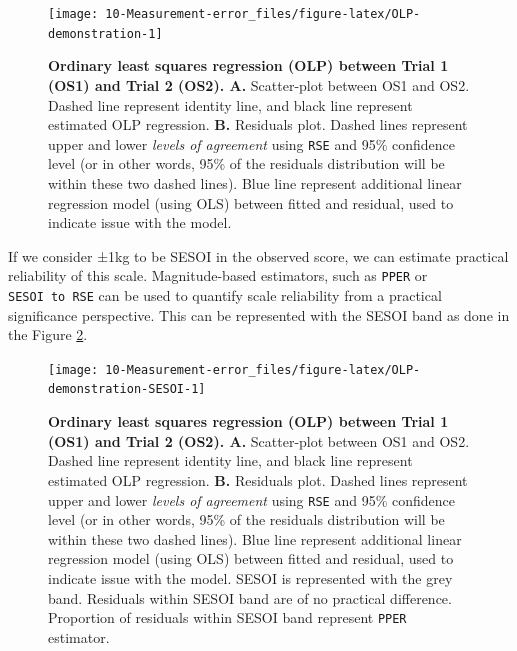\documentclass[
]{book}
\begin{document}
\begin{figure}

{\centering \texttt{[image: 10-Measurement-error\_files/figure-latex/OLP-demonstration-1]} 

}

\caption{\textbf{Ordinary least squares regression (OLP) between Trial 1 (OS1) and Trial 2 (OS2). A. } Scatter-plot between OS1 and OS2. Dashed line represent identity line, and black line represent estimated OLP regression. \textbf{B.} Residuals plot. Dashed lines represent upper and lower \emph{levels of agreement} using \texttt{RSE} and 95\% confidence level (or in other words, 95\% of the residuals distribution will be within these two dashed lines). Blue line represent additional linear regression model (using OLS) between fitted and residual, used to indicate issue with the model.}\label{fig:OLP-demonstration}
\end{figure}



If we consider ±1kg to be SESOI in the observed score, we can estimate practical reliability of this scale. Magnitude-based estimators, such as \texttt{PPER} or \texttt{SESOI\ to\ RSE} can be used to quantify scale reliability from a practical significance perspective. This can be represented with the SESOI band as done in the Figure \ref{fig:OLP-demonstration-SESOI}.

\begin{figure}

{\centering \texttt{[image: 10-Measurement-error\_files/figure-latex/OLP-demonstration-SESOI-1]} 

}

\caption{\textbf{Ordinary least squares regression (OLP) between Trial 1 (OS1) and Trial 2 (OS2). A. } Scatter-plot between OS1 and OS2. Dashed line represent identity line, and black line represent estimated OLP regression. \textbf{B.} Residuals plot. Dashed lines represent upper and lower \emph{levels of agreement} using \texttt{RSE} and 95\% confidence level (or in other words, 95\% of the residuals distribution will be within these two dashed lines). Blue line represent additional linear regression model (using OLS) between fitted and residual, used to indicate issue with the model. SESOI is represented with the grey band. Residuals within SESOI band are of no practical difference. Proportion of residuals within SESOI band represent \texttt{PPER} estimator.}\label{fig:OLP-demonstration-SESOI}
\end{figure}
\end{document}
